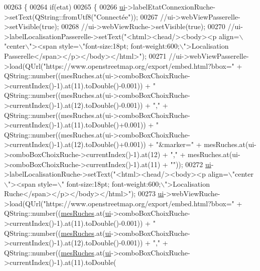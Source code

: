 \begin{DoxyCode}
00263 \{
00264     \textcolor{keywordflow}{if}(etat)
00265     \{
00266         \hyperlink{class_ruche_ihm_a64786058bd7f88ca2f1e9743bb27c25b}{ui}->labelEtatConnexionRuche->setText(QString::fromUtf8(\textcolor{stringliteral}{"Connectée"}));
00267         \textcolor{comment}{//ui->webViewPasserelle->setVisible(true);}
00268         \textcolor{comment}{//ui->webViewRuche->setVisible(true);}
00270 \textcolor{comment}{}        \textcolor{comment}{//ui->labelLocalisationPasserelle->setText("<html><head/><body><p align=\(\backslash\)"center\(\backslash\)"><span
       style=\(\backslash\)"font-size:18pt; font-weight:600;\(\backslash\)">Localisation Passerelle</span></p></body></html>");}
00271         \textcolor{comment}{//ui->webViewPasserelle->load(QUrl("https://www.openstreetmap.org/export/embed.html?bbox=" +
       QString::number((mesRuches.at(ui->comboBoxChoixRuche->currentIndex()-1).at(11).toDouble()-0.001)) + "%
       QString::number((mesRuches.at(ui->comboBoxChoixRuche->currentIndex()-1).at(12).toDouble()-0.001)) + "," +
       QString::number((mesRuches.at(ui->comboBoxChoixRuche->currentIndex()-1).at(11).toDouble()+0.001)) + "%
       QString::number((mesRuches.at(ui->comboBoxChoixRuche->currentIndex()-1).at(12).toDouble()+0.001)) + "&marker=" +
       mesRuches.at(ui->comboBoxChoixRuche->currentIndex()-1).at(12) + "," +
       mesRuches.at(ui->comboBoxChoixRuche->currentIndex()-1).at(11) + ""));}
00272         \hyperlink{class_ruche_ihm_a64786058bd7f88ca2f1e9743bb27c25b}{ui}->labelLocalisationRuche->setText(\textcolor{stringliteral}{"<html><head/><body><p align=\(\backslash\)"center\(\backslash\)"><span style=\(\backslash\)"
      font-size:18pt; font-weight:600;\(\backslash\)">Localisation Ruche</span></p></body></html>"});
00273         \hyperlink{class_ruche_ihm_a64786058bd7f88ca2f1e9743bb27c25b}{ui}->webViewRuche->load(QUrl(\textcolor{stringliteral}{"https://www.openstreetmap.org/export/embed.html?bbox="} + 
      QString::number((\hyperlink{class_ruche_ihm_ab7741fa67b19cbb2da7eb12c58cf83c1}{mesRuches}.at(\hyperlink{class_ruche_ihm_a64786058bd7f88ca2f1e9743bb27c25b}{ui}->comboBoxChoixRuche->currentIndex()-1).at(11).toDouble()-0.001)) + \textcolor{stringliteral}{"%
      QString::number((\hyperlink{class_ruche_ihm_ab7741fa67b19cbb2da7eb12c58cf83c1}{mesRuches}.at(\hyperlink{class_ruche_ihm_a64786058bd7f88ca2f1e9743bb27c25b}{ui}->comboBoxChoixRuche->currentIndex()-1).at(12).toDouble()-0.001))
       + \textcolor{stringliteral}{","} + QString::number((\hyperlink{class_ruche_ihm_ab7741fa67b19cbb2da7eb12c58cf83c1}{mesRuches}.at(\hyperlink{class_ruche_ihm_a64786058bd7f88ca2f1e9743bb27c25b}{ui}->comboBoxChoixRuche->currentIndex()-1).at(11).toDouble(
}
\end{DoxyCode}
